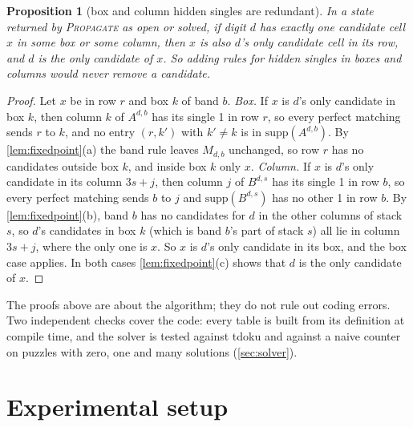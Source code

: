 \documentclass[11pt]{article}
\newtheorem{proposition}[theorem]{Proposition}
\theoremstyle{definition}
\theoremstyle{plain}
\let\origtextsc\textsc
\renewcommand{\textsc}[1]{\textup{\origtextsc{#1}}}
\begin{document}
\begin{proposition}[box and column hidden singles are redundant]
\label{prop:hidden}
In a state returned by \textsc{Propagate} as open or solved, if digit $d$ has exactly one candidate cell $x$ in some box
or some column, then $x$ is also $d$'s only candidate cell in its row, and $d$ is the only candidate of $x$. So adding
rules for hidden singles in boxes and columns would never remove a candidate.
\end{proposition}
\begin{proof}
Let $x$ be in row $r$ and box $k$ of band $b$. \emph{Box.} If $x$ is $d$'s only candidate in box $k$, then column $k$ of
$A^{d,b}$ has its single 1 in row $r$, so every perfect matching sends $r$ to $k$, and no entry $(r,k')$ with $k'\neq
k$ is in $\mathrm{supp}(A^{d,b})$. By \cref{lem:fixedpoint}(a) the band rule leaves $M_{d,b}$ unchanged, so row $r$ has
no candidates outside box $k$, and inside box $k$ only $x$. \emph{Column.} If $x$ is $d$'s only candidate in its column
$3s+j$, then column $j$ of $B^{d,s}$ has its single 1 in row $b$, so every perfect matching sends $b$ to $j$ and
$\mathrm{supp}(B^{d,s})$ has no other 1 in row $b$. By \cref{lem:fixedpoint}(b), band $b$ has no candidates for $d$ in
the other columns of stack $s$, so $d$'s candidates in box $k$ (which is band $b$'s part of stack $s$) all lie in column
$3s+j$, where the only one is $x$. So $x$ is $d$'s only candidate in its box, and the box case applies. In both cases
\cref{lem:fixedpoint}(c) shows that $d$ is the only candidate of $x$.
\end{proof}

The proofs above are about the algorithm; they do not rule out coding errors. Two independent checks cover the code:
every table is built from its definition at compile time, and the solver is tested against tdoku and against a naive
counter on puzzles with zero, one and many solutions (\cref{sec:solver}).

\section{Experimental setup}
\label{sec:setup}
\end{document}
